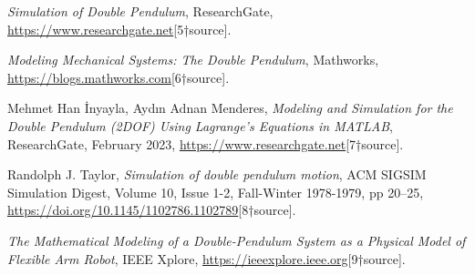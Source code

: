 \documentclass[12pt]{article}
\begin{document}
\begin{thebibliography}{9}

\textit{Simulation of Double Pendulum},
ResearchGate,
\url{https://www.researchgate.net}[5†source].

\textit{Modeling Mechanical Systems: The Double Pendulum},
Mathworks,
\url{https://blogs.mathworks.com}[6†source].

Mehmet Han İnyayla, Aydın Adnan Menderes,
\textit{Modeling and Simulation for the Double Pendulum (2DOF) Using Lagrange's Equations in MATLAB},
ResearchGate, February 2023,
\url{https://www.researchgate.net}[7†source].

Randolph J. Taylor,
\textit{Simulation of double pendulum motion},
ACM SIGSIM Simulation Digest, Volume 10, Issue 1-2, Fall-Winter 1978-1979, pp 20–25,
\url{https://doi.org/10.1145/1102786.1102789}[8†source].

\textit{The Mathematical Modeling of a Double-Pendulum System as a Physical Model of Flexible Arm Robot},
IEEE Xplore,
\url{https://ieeexplore.ieee.org}[9†source].

\end{thebibliography}
\end{document}
